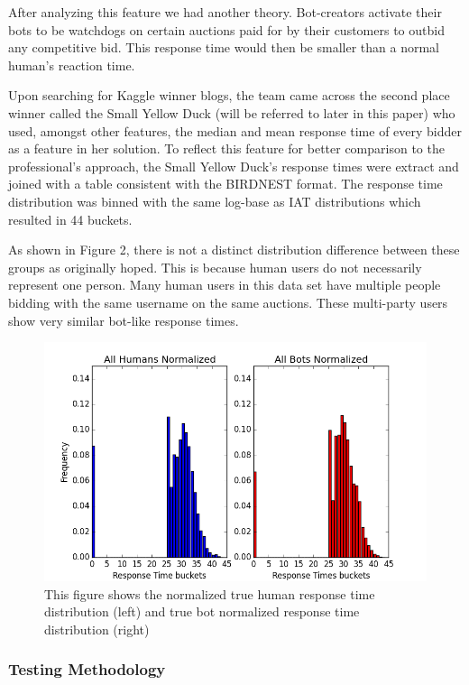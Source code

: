 \documentclass{article} %
\begin{document}
After analyzing this feature we had another theory. Bot-creators activate their bots to be watchdogs on certain auctions paid for by their customers to outbid any competitive bid. This response time would then be smaller than a normal human's reaction time.

Upon searching for Kaggle winner blogs, the team came across the second place winner called the Small Yellow Duck (will be referred to later in this paper) who used, amongst other features, the median and mean response time of every bidder as a feature in her solution. To reflect this feature for better comparison to the professional's approach, the Small Yellow Duck's response times were extract and joined with a table consistent with the BIRDNEST format. The response time distribution was binned with the same log-base as IAT distributions which resulted in 44 buckets.

As shown in Figure 2, there is not a distinct distribution difference between these groups as originally hoped. This is because human users do not necessarily represent one person. Many human users in this data set have multiple people bidding with the same username on the same auctions. These multi-party users show very similar bot-like response times.

\begin{figure}[!htb]
\centering
{\caption{This figure shows the normalized true human response time distribution (left) and true bot normalized response time distribution (right)} \includegraphics[scale=0.5]{img/bird_res_dist.png}}
\end{figure}

\subsubsection{Testing Methodology}
\end{document}
